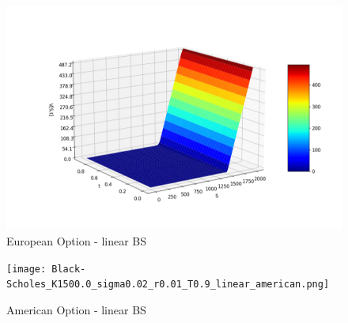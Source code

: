 \documentclass[10pt,a4paper]{article}
\begin{document}
  	\begin{figure}[H]
  	\centering
  	\includegraphics[width = 1.0\linewidth]{Black-Scholes_K1500.0_sigma0.02_r0.01_T0.9_linear_european.png}
  	\caption[European Option - linear BS]{European Option - linear BS}
  	\label{fig:E}
  \end{figure}
  
  \begin{figure}[H]
  	\centering
  	\texttt{[image: Black-Scholes\_K1500.0\_sigma0.02\_r0.01\_T0.9\_linear\_american.png]}
  	\caption[American Option - linear BS]{American Option - linear BS}
  	\label{fig:A}
  \end{figure}
\end{document}
